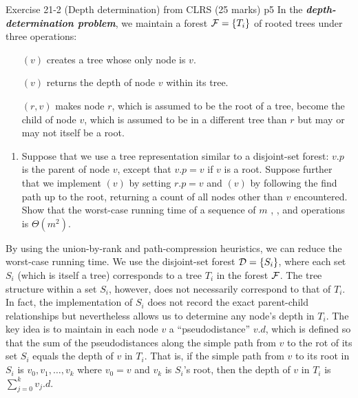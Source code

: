 \documentclass[a4paper, 11pt]{article}
\begin{document}
\begin{problem}{%
	Exercise 21-2 (Depth determination) from CLRS	\hfill  (25 marks)
}{p5%
}
In the \textbf{\textit{depth-determination problem}}, we maintain a forest $\mathcal{F}=\{T_i\}$ of rooted
trees under three operations:
\begin{itemize}[align=left, leftmargin=1cm,itemsep=-0.2cm]
	\item[\prb{Make-Tree}$(v)$] creates a tree whose only node is $v$.
	\item[\prb{Find-Depth}$(v)$] returns the depth of node $v$ within its tree.
	\item[\prb{Graft}$(r,v)$] makes node $r$, which is assumed to be the root of a tree, become the
	child of node $v$, which is assumed to be in a different tree than $r$ but may or may
	not itself be a root.
\end{itemize}
\begin{enumerate}[label=\bfseries\itshape\alph*.]
	\item Suppose that we use a tree representation similar to a disjoint-set forest: $v.p$
	is the parent of node $v$, except that $v.p=v$ if $v$ is a root. Suppose further
	that we implement $(v)$ by setting $r.p=v$ and $(v)$ by
	following the find path up to the root, returning a count of all nodes other than $v$
	encountered. Show that the worst-case running time of a sequence of $m$ ,  , and  operations is $\Theta(m^2)$.
\end{enumerate}
	By using the union-by-rank and path-compression heuristics, we can reduce the
worst-case running time. We use the disjoint-set forest $\mathcal{D}=\{S_i\}$, where each
set $S_i$ (which is itself a tree) corresponds to a tree $T_i$ in the forest $\mathcal{F} $. The tree
structure within a set $S_i$, however, does not necessarily correspond to that of $T_i$. In
fact, the implementation of $S_i$ does not record the exact parent-child relationships
but nevertheless allows us to determine any node’s depth in $T_i$.
The key idea is to maintain in each node $v$ a ``pseudodistance” $v.d$, which is
defined so that the sum of the pseudodistances along the simple path from $v$ to the rot of its set $S_i$ equals the depth of $v$ in $T_i$. That is, if the simple path from $v$ to its root in $S_i$ is $v_0,v_1,\dots, v_k$ where $v_0=v$ and $v_k$ is $S_i$'s root, then the depth of $v$ in $T_i$ is $\sum\limits_{j=0}^kv_j.d$.
\begin{enumerate}[resume, label=\bfseries\itshape\alph*.]

\end{enumerate}
\end{problem}
\end{document}
